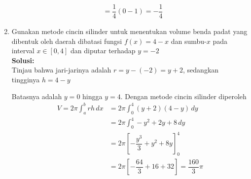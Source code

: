 \documentclass{article}
\begin{document}
\begin{enumerate}
\begin{align*}
	&= \dfrac{1}{4}(0-1) = -\dfrac{1}{4}
	\end{align*}
	\item Gunakan metode cincin silinder untuk menentukan volume benda padat yang dibentuk oleh daerah dibatasi fungsi $f(x)=4-x$ dan sumbu-$x$ pada interval $x\in [0,4]$ dan diputar terhadap $y=-2$\\
	\textbf{Solusi:}\\
	Tinjau bahwa jari-jarinya adalah $r=y-(-2)=y+2$, sedangkan tingginya $h=4-y$
	\begin{center}
		\end{center}
		Batasnya adalah $y=0$ hingga $y=4$. Dengan metode cincin silinder diperoleh 
		\begin{align*}
		V = 2\pi \int_a^b rh\, dx &= 2\pi \int_0^4 (y+2)(4-y)\, dy\\
		&= 2\pi \int_0^4 -y^2+2y+8 \, dy\\
		&= 2\pi \left[-\dfrac{y^3}{3}+y^2+8y\right]^4_0\\
		&= 2\pi \left[-\dfrac{64}{3}+16+32\right] = \dfrac{160}{3}\pi
		\end{align*}
\end{enumerate}
\newpage
\end{document}
